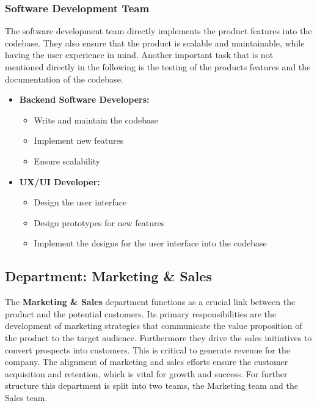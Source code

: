 \subsubsection*{Software Development Team}
The software development team directly implements the product features into the codebase.
They also ensure that the product is scalable and maintainable, while having the user experience in mind.
Another important task that is not mentioned directly in the following is the testing of the products features and the documentation of the codebase.
\begin{itemize}
    \item \textbf{Backend Software Developers:}
            \begin{itemize}
                \item Write and maintain the codebase
                \item Implement new features
                \item Ensure scalability
            \end{itemize}
    \item \textbf{UX/UI Developer:}
            \begin{itemize}
                \item Design the user interface
                \item Design prototypes for new features
                \item Implement the designs for the user interface into the codebase
            \end{itemize}
\end{itemize}

\subsection{Department: Marketing \& Sales}
The \textbf{Marketing \& Sales} department functions as a crucial link between the product and the potential customers.
Its primary responsibilities are the development of marketing strategies that communicate the value proposition of the product to the target audience.
Furthermore they drive the sales initiatives to convert prospects into customers.
This is critical to generate revenue for the company.
The alignment of marketing and sales efforts ensure the customer acquisition and retention, which is vital for growth and success.
For further structure this department is split into two teams, the Marketing team and the Sales team.

